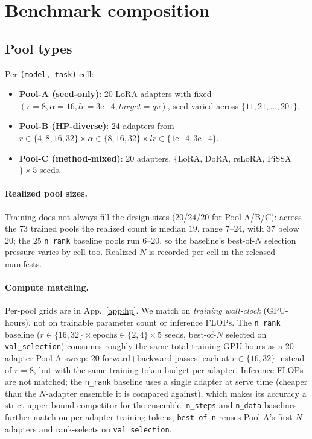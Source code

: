 \documentclass[11pt]{article}
\begin{document}
\section{Benchmark composition}\label{sec:setup}

\subsection{Pool types}

Per \texttt{(model, task)} cell:
\begin{itemize}[leftmargin=*]
\item \textbf{Pool-A (seed-only)}: 20 LoRA adapters with fixed $(r=8, \alpha=16, lr=3\mathrm{e}{-4}, target=qv)$, seed varied across $\{11, 21, \dots, 201\}$.
\item \textbf{Pool-B (HP-diverse)}: 24 adapters from $r \in \{4,8,16,32\} \times \alpha \in \{8,16,32\} \times lr \in \{1\mathrm{e}{-4}, 3\mathrm{e}{-4}\}$.
\item \textbf{Pool-C (method-mixed)}: 20 adapters, $\{$LoRA, DoRA, rsLoRA, PiSSA$\} \times 5$ seeds.
\end{itemize}

\paragraph{Realized pool sizes.} Training does not always fill the design sizes ($20$/$24$/$20$ for Pool-A/B/C): across the $73$ trained pools the realized count is median $19$, range $7$--$24$, with $37$ below $20$; the $25$ \texttt{n\_rank} baseline pools run $6$--$20$, so the baseline's best-of-$N$ selection pressure varies by cell too. Realized $N$ is recorded per cell in the released manifests.

\paragraph{Compute matching.} Per-pool grids are in App.~\ref{app:hp}. We match on \emph{training wall-clock} (GPU-hours), not on trainable parameter count or inference FLOPs. The \texttt{n\_rank} baseline ($r{\in}\{16, 32\} \times \text{epochs}{\in}\{2, 4\} \times 5$ seeds, best-of-$N$ selected on \texttt{val\_selection}) consumes roughly the same total training GPU-hours as a 20-adapter Pool-A sweep: 20 forward+backward passes, each at $r{\in}\{16,32\}$ instead of $r{=}8$, but with the same training token budget per adapter. Inference FLOPs are not matched; the \texttt{n\_rank} baseline uses a single adapter at serve time (cheaper than the $N$-adapter ensemble it is compared against), which makes its accuracy a strict upper-bound competitor for the ensemble. \texttt{n\_steps} and \texttt{n\_data} baselines further match on per-adapter training tokens; \texttt{best\_of\_n} reuses Pool-A's first $N$ adapters and rank-selects on \texttt{val\_selection}.
\end{document}
